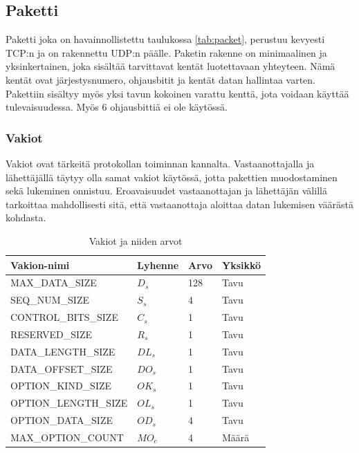 \documentclass[a4paper,12pt]{article}
\begin{document}
    \subsection{Paketti}\label{sec:paketti}
    Paketti joka on havainnollistettu taulukossa \ref{tab:packet}, perustuu kevyesti TCP:n ja on rakennettu UDP:n päälle. Paketin rakenne on minimaalinen ja yksinkertainen, joka sisältää tarvittavat kentät luotettavaan yhteyteen. Nämä kentät ovat järjestysnumero, ohjausbitit ja kentät datan hallintaa varten. Pakettiin sisältyy myös yksi tavun kokoinen varattu kenttä, jota voidaan käyttää tulevaisuudessa. Myös 6 ohjausbittiä ei ole käytössä.

    \subsubsection{Vakiot}
    Vakiot ovat tärkeitä protokollan toiminnan kannalta. Vastaanottajalla ja lähettäjällä täytyy olla samat vakiot käytössä, jotta pakettien muodostaminen sekä lukeminen onnistuu. Eroavaisuudet vastaanottajan ja lähettäjän välillä tarkoittaa mahdollisesti sitä, että vastaanottaja aloittaa datan lukemisen väärästä kohdasta.


    \begin{table}[h!]
        \centering
        \begin{tabular}{llll}
            Vakion-nimi          & Lyhenne & Arvo & Yksikkö \\
            \hline
            MAX\_DATA\_SIZE      & $D_s$   & 128  & Tavu    \\
            SEQ\_NUM\_SIZE       & $S_s$   & 4    & Tavu    \\
            CONTROL\_BITS\_SIZE  & $C_s$   & 1    & Tavu    \\
            RESERVED\_SIZE       & $R_s$   & 1    & Tavu    \\
            DATA\_LENGTH\_SIZE   & $DL_s$  & 1    & Tavu    \\
            DATA\_OFFSET\_SIZE   & $DO_s$  & 1    & Tavu    \\
            OPTION\_KIND\_SIZE   & $OK_s$  & 1    & Tavu    \\
            OPTION\_LENGTH\_SIZE & $OL_s$  & 1    & Tavu    \\
            OPTION\_DATA\_SIZE   & $OD_s$  & 4    & Tavu    \\
            MAX\_OPTION\_COUNT   & $MO_c$  & 4    & Määrä
        \end{tabular}
        \caption{Vakiot ja niiden arvot}
        \label{tab:vakiot}
    \end{table}
\end{document}
